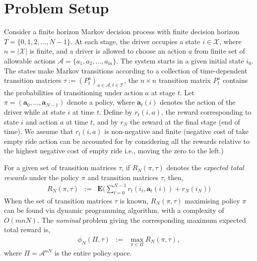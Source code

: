 \section{Problem Setup}
Consider a finite horizon Markov decision process with finite decision horizon $T = \{0,1,2, ..., N-1\}$. At each stage, the driver occupies a state $i \in \mathcal{X}$, where $n = |\mathcal{X}|$ is finite, and a driver is allowed to choose an action $a$ from finite set of allowable actions $\mathcal{A} = \{a_1, a_2, ..., a_m\}$. The system starts in a given initial state $i_0$. The states make Markov transitions according to a collection of time-dependent transition matrices $\tau := (P^{a}_t)_{a \in \mathcal{A}, t \in \mathcal{T}}$, the $n \times n$ transition matrix $P^{a}_t$ contains the probabilities of transitioning under action $a$ at stage $t$. Let $\pi = (\textbf{a}_0, ..., \textbf{a}_{N-1})$ denote a policy, where $\textbf{a}_t(i)$ denotes the action of the driver while at state $i$ at time $t$. Define by $r_t(i,a)$, the reward corresponding to state $i$ and action $a$ at time $t$, and by $r_N$ the reward at the final stage (end of time). We assume that $r_t(i,a)$ is non-negative and finite (negative cost of take empty ride action can be accounted for by considering all the rewards relative to the highest negative cost of empty ride i.e., moving the zero to the left.)

For a given set of transition matrices $\tau$, if $R_N(\pi, \tau)$ denotes the \textit{expected total rewards} under the policy $\pi$ and transition matrices $\tau$, then,
\begin{eqnarray*}
R_N(\pi, \tau) &:=& \textbf{E}\bigg(\sum_{t=0}^{N-1} r_t(i_t,\textbf{a}_t(i)) + r_N(i_N)\bigg)
\end{eqnarray*}
When the set of transition matrices $\tau$ is known,  $R_N(\pi, \tau)$ maximising policy $\pi$ can be found via dynamic programming algorithm, with a complexity of $O(mnN)$. The \textit{nominal} problem giving the corresponding maximum expected total reward is,
\begin{eqnarray*}
\phi_N(\Pi, \tau) &:=& \max_{\pi \in \Pi} R_N(\pi, \tau),
\end{eqnarray*}
where $\Pi = \mathcal{A}^{nN}$ is the entire policy space.

